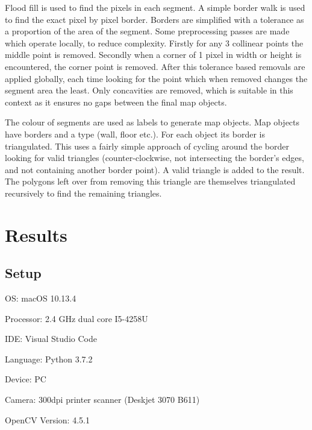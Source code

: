 \documentclass{IEEEtran}
\begin{document}
Flood fill is used to find the pixels in each segment. A simple border walk is used to find the exact pixel by pixel border. Borders are simplified with a tolerance as a proportion of the area of the segment. Some preprocessing passes are made which operate locally, to reduce complexity. Firstly for any 3 collinear points the middle point is removed. Secondly when a corner of 1 pixel in width or height is encountered, the corner point is removed. After this tolerance based removals are applied globally, each time looking for the point which when removed changes the segment area the least. Only concavities are removed, which is suitable in this context as it ensures no gaps between the final map objects.

The colour of segments are used as labels to generate map objects. Map objects have borders and a type (wall, floor etc.). For each object its border is triangulated. This uses a fairly simple approach of cycling around the border looking for valid triangles (counter-clockwise, not intersecting the border's edges, and not containing another border point). A valid triangle is added to the result. The polygons left over from removing this triangle are themselves triangulated recursively to find the remaining triangles. 


\section{Results}

\subsection{Setup}
OS: macOS 10.13.4

Processor: 2.4 GHz dual core I5-4258U

IDE: Visual Studio Code

Language: Python 3.7.2

Device: PC

Camera: 300dpi printer scanner (Deskjet 3070 B611)

OpenCV Version: 4.5.1




\end{document}
